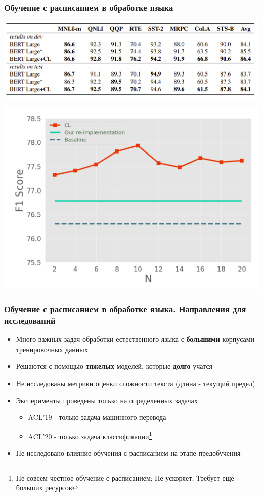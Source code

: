 \documentclass{beamer}
\begin{document}
\begin{frame}
	\frametitle{Обучение с расписанием в обработке языка}
	\begin{center}
		\includegraphics[scale=0.3]{acl20_results}
	\end{center}

	\begin{center}
		\includegraphics[scale=0.3]{acl20_results2}
	\end{center}

\end{frame}

\begin{frame}
	\frametitle{Обучение с расписанием в обработке языка. Направления для исследований}
	\begin{itemize}
		\item Много важных задач обработки естественного языка с {\bf большими} корпусами тренировочных данных
		\item Решаются с помощью {\bf тяжелых} моделей, которые {\bf долго} учатся
		\item Не иcследованы метрики оценки сложности текста (длина - текущий предел)
		\item Эксперименты проведены только на определенных задачах
			\begin{itemize}
				\item ACL'19 - только задача машинного перевода
				\item ACL'20 - только задача классификации\footnote[1]{Не совсем честное обучение с расписанием; Не ускоряет; Требует еще больших ресурсов}
			\end{itemize}
		\item Не исследовано влияние обучения с расписанием на этапе предобучения
	\end{itemize}
\end{frame}
\end{document}
